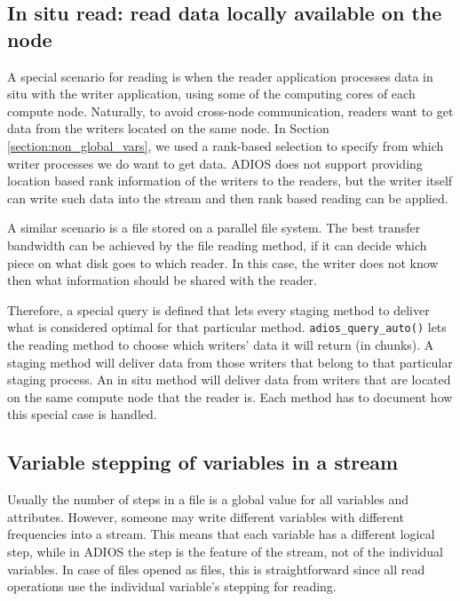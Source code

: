 \subsection{In situ read: read data locally available on the node}
A special scenario for reading is when the reader application processes data in situ with the writer application, using some of the computing cores of each compute node. Naturally, to avoid cross-node communication, readers want to get data from the writers located on the same node. In Section \ref {section:non_global_vars}, we used a rank-based selection to specify from which writer processes we do want to get data. ADIOS does not support providing location based rank information of the writers to the readers, but the writer itself can write such data into the stream and then rank based reading can be applied. 

A similar scenario is a file stored on a parallel file system. The best transfer bandwidth can be achieved by the file reading method, if it can decide which piece on what disk goes to which reader. In this case, the writer does not know then what information should be shared with the reader. 

Therefore, a special query is defined that lets every staging method to deliver what is considered optimal for that particular method. \lstinline+adios_query_auto()+ lets the reading method to choose which writers' data it will return (in chunks). A staging method will deliver data from those writers that belong to that particular staging process. An in situ method will deliver data from writers that are located on the same compute node that the reader is. Each method has to document how this special case is handled. 



\label {label_section_variable_stepping}
\subsection {Variable stepping of variables in a stream}
Usually the number of steps in a file is a global value for all variables and attributes. However, someone may write different variables with different frequencies into a stream. This means that each variable has a different logical step, while in ADIOS the step is the feature of the stream, not of the individual variables. In case of files opened as files, this is straightforward since all read operations use the individual variable's stepping for reading. 

